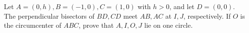 Let $A=(0,h),B=(-1,0),C=(1,0)$ with $h>0$, and let $D=(0,0)$. The perpendicular bisectors of $BD,CD$ meet $AB,AC$ at $I,J$, respectively. If $O$ is the circumcenter of $ABC$, prove that $A,I,O,J$ lie on one circle.
